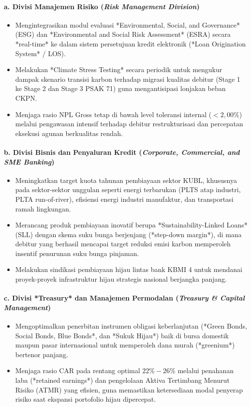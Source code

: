 \documentclass[12pt,a4paper]{article}
\numberwithin{equation}{section}
\begin{document}
\paragraph{a. Divisi Manajemen Risiko (\emph{Risk Management Division})}
\begin{itemize}
  \item Mengintegrasikan modul evaluasi *Environmental, Social, and Governance* (ESG) dan *Environmental and Social Risk Assessment* (ESRA) secara *real-time* ke dalam sistem persetujuan kredit elektronik (*Loan Origination System* / LOS).
  \item Melakukan *Climate Stress Testing* secara periodik untuk mengukur dampak skenario transisi karbon terhadap migrasi kualitas debitur (Stage 1 ke Stage 2 dan Stage 3 PSAK 71) guna mengantisipasi lonjakan beban CKPN.
  \item Menjaga rasio NPL Gross tetap di bawah level toleransi internal ($<2{,}00\%$) melalui pengawasan intensif terhadap debitur restrukturisasi dan percepatan eksekusi agunan berkualitas rendah.
\end{itemize}

\paragraph{b. Divisi Bisnis dan Penyaluran Kredit (\emph{Corporate, Commercial, and SME Banking})}
\begin{itemize}
  \item Meningkatkan target kuota tahunan pembiayaan sektor KUBL, khususnya pada sektor-sektor unggulan seperti energi terbarukan (PLTS atap industri, PLTA run-of-river), efisiensi energi industri manufaktur, dan transportasi ramah lingkungan.
  \item Merancang produk pembiayaan inovatif berupa *Sustainability-Linked Loans* (SLL) dengan skema suku bunga berjenjang (*step-down margin*), di mana debitur yang berhasil mencapai target reduksi emisi karbon memperoleh insentif penurunan suku bunga pinjaman.
  \item Melakukan sindikasi pembiayaan hijau lintas bank KBMI 4 untuk mendanai proyek-proyek infrastruktur hijau strategis nasional berjangka panjang.
\end{itemize}

\paragraph{c. Divisi *Treasury* dan Manajemen Permodalan (\emph{Treasury \& Capital Management})}
\begin{itemize}
  \item Mengoptimalkan penerbitan instrumen obligasi keberlanjutan (*Green Bonds, Social Bonds, Blue Bonds*, dan *Sukuk Hijau*) baik di bursa domestik maupun pasar internasional untuk memperoleh dana murah (*greenium*) bertenor panjang.
  \item Menjaga rasio CAR pada rentang optimal $22\% - 26\%$ melalui penahanan laba (*retained earnings*) dan pengelolaan Aktiva Tertimbang Menurut Risiko (ATMR) yang efisien, guna memastikan ketersediaan modal penyerap risiko saat ekspansi portofolio hijau dipercepat.
\end{itemize}
\end{document}
